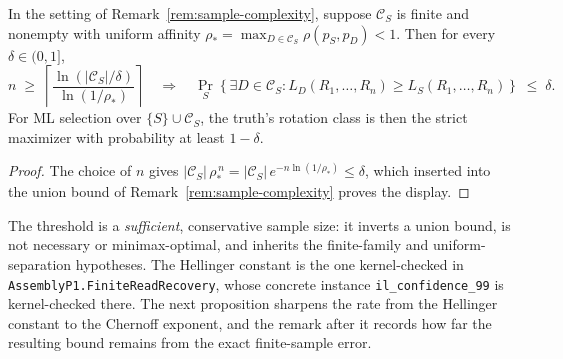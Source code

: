 \begin{corollary}
\label{cor:explicit-sample-size}
In the setting of Remark~\ref{rem:sample-complexity}, suppose
$\mathcal C_S$ is finite and nonempty with uniform affinity
$\rho_*=\max_{D\in\mathcal C_S}\rho(p_S,p_D)<1$. Then for every
$\delta\in(0,1]$,
\[
  n\;\ge\;
  \left\lceil\frac{\ln(|\mathcal C_S|/\delta)}{\ln(1/\rho_*)}\right\rceil
  \quad\Longrightarrow\quad
  \Pr_S\!\left\{\exists D\in\mathcal C_S:
      L_D(R_1,\dots,R_n)\ge L_S(R_1,\dots,R_n)\right\}
  \;\le\;\delta .
\]
For ML selection over $\{S\}\cup\mathcal C_S$, the truth's rotation class is
then the strict maximizer with probability at least $1-\delta$.
\end{corollary}
\begin{proof}
The choice of $n$ gives
$|\mathcal C_S|\,\rho_*^{\,n}
=|\mathcal C_S|\,e^{-n\ln(1/\rho_*)}\le\delta$, which inserted into the union
bound of Remark~\ref{rem:sample-complexity} proves the display.
\end{proof}
The threshold is a \emph{sufficient}, conservative sample size: it inverts a
union bound, is not necessary or minimax-optimal, and inherits the
finite-family and uniform-separation hypotheses. The Hellinger constant is the
one kernel-checked in \texttt{AssemblyP1.FiniteReadRecovery}, whose concrete
instance \texttt{il\_confidence\_99} is kernel-checked there. The next
proposition sharpens the rate from the Hellinger constant to the Chernoff
exponent, and the remark after it records how far the resulting bound remains
from the exact finite-sample error.

